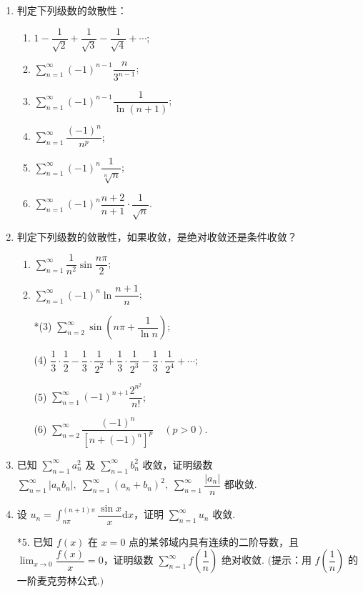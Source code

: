 \begin{enumerate}\setlength{\itemsep}{7pt}
    \item 判定下列级数的敛散性：
    \begin{enumerate}[(1)]\setlength{\itemsep}{10pt}\setlength{\topsep}{15pt}
        \item $\displaystyle 1-\dfrac{1}{\sqrt{2}}+\dfrac{1}{\sqrt{3}}-\dfrac{1}{\sqrt{4}}+\cdots$;
        \item $\displaystyle \sum_{n=1}^{\infty}(-1)^{n-1}\dfrac{n}{3^{n-1}}$;
        \item $\displaystyle \sum_{n=1}^{\infty}(-1)^{n-1}\dfrac{1}{\ln(n+1)}$;
        \item $\displaystyle \sum_{n=1}^{\infty}\dfrac{(-1)^n}{n^p}$;
        \item $\displaystyle \sum_{n=1}^{\infty}(-1)^{n}\dfrac{1}{\sqrt[n]{n}}$;
        \item $\displaystyle \sum_{n=1}^{\infty}(-1)^{n}\dfrac{n+2}{n+1}\cdot\dfrac{1}{\sqrt{n}}$.
    \end{enumerate}

    \item 判定下列级数的敛散性，如果收敛，是绝对收敛还是条件收敛？
    \begin{enumerate}[1]\setlength{\itemsep}{10pt}\setlength{\topsep}{15pt}
        \item $\displaystyle \sum_{n=1}^{\infty}\dfrac{1}{n^2}\sin\dfrac{n\pi}{2}$;
        \item $\displaystyle \sum_{n=1}^{\infty}(-1)^n\ln\dfrac{n+1}{n}$;
        \item[*(3)] $\displaystyle \sum_{n=2}^{\infty}\sin\left(n\pi+\dfrac{1}{\ln n}\right)$;
        \item[(4)] $\displaystyle \dfrac{1}{3}\cdot\dfrac{1}{2}-\dfrac{1}{3}\cdot\dfrac{1}{2^2}+\dfrac{1}{3}\cdot\dfrac{1}{2^3}-\dfrac{1}{3}\cdot\dfrac{1}{2^4}+\cdots$;
        \item[(5)] $\displaystyle \sum_{n=1}^{\infty}(-1)^{n+1}\dfrac{2^{n^2}}{n!}$;
        \item[(6)] $\displaystyle \sum_{n=2}^{\infty}\dfrac{(-1)^{n}}{[n+(-1)^n]^p}\quad(p>0)$.  
    \end{enumerate}

    \item 已知 $\displaystyle \sum_{n=1}^{\infty}a_n^2$ 及 $\displaystyle \sum_{n=1}^{\infty}b_n^2$ 收敛，证明级数 $\displaystyle \sum_{n=1}^{\infty}|a_nb_n|,\;\sum_{n=1}^{\infty}(a_n+b_n)^2,\;\sum_{n=1}^{\infty}\dfrac{|a_n|}{n}$ 都收敛.
    
    \item 设 $\displaystyle u_n=\int_{n\pi}^{(n+1)\pi}\dfrac{\sin x}{x}\text{d}x$，证明 $\sum_{n=1}^{\infty}u_n$ 收敛.
    
    \item[*5.] 已知 $f(x)$ 在 $x=0$ 点的某邻域内具有连续的二阶导数，且 $\displaystyle\lim_{x\to0}\dfrac{f(x)}{x}=0$，证明级数 $\displaystyle \sum_{n=1}^{\infty}f\left(\dfrac{1}{n}\right)$ 绝对收敛.  $\bigg($提示：用 $f\left(\dfrac{1}{n}\right)$ 的一阶麦克劳林公式.$\bigg)$
\end{enumerate}

